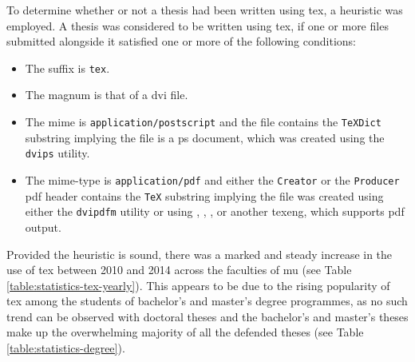   To determine whether or not a thesis had been written using \gls{tex}, a heuristic was employed. A thesis was considered to be written using \gls{tex}, if one or more files submitted alongside it satisfied one or more of the following conditions:

  \begin{itemize}
    \item The suffix is \texttt{tex}.
    \item The \gls{magnum} is that of a \acrshort{dvi} file.
    \item The \gls{mime} is \texttt{application/postscript} and the file contains the \texttt{TeXDict} substring implying the file is a \gls{ps} document, which was created using the \texttt{dvips} utility.
    \item The mime-type is \texttt{application/pdf} and either the \texttt{Creator} or the \texttt{Producer} \gls{pdf} header contains the \texttt{TeX} substring implying the file was created using either the \texttt{dvipdfm} utility or using , , ,  or another \gls{texeng}, which supports \gls{pdf} output.
  \end{itemize}

  Provided the heuristic is sound, there was a marked and steady increase in the use of \gls{tex} between 2010 and 2014 across the faculties of \gls{mu} (see Table \ref{table:statistics-tex-yearly}). This appears to be due to the rising popularity of \gls{tex} among the students of bachelor's and master's degree programmes, as no such trend can be observed with doctoral theses and the bachelor's and master's theses make up the overwhelming majority of all the defended theses (see Table \ref{table:statistics-degree}).

